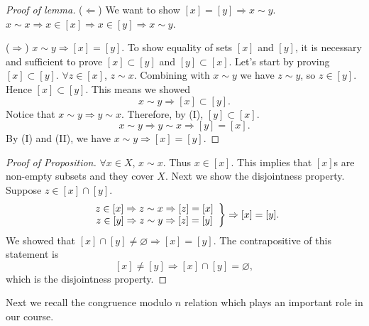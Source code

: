 \begin{proof}[Proof of lemma]
    ($\Leftarrow$) We want to show $[x]=[y]\Rightarrow x\sim y$.
    $x\sim x\Rightarrow x\in[x]\Rightarrow x\in[y]\Rightarrow x\sim y$.

    ($\Rightarrow$) $x\sim y\Rightarrow[x]=[y]$.
    To show equality of sets $[x]$ and $[y]$, it is necessary
    and sufficient to prove $[x]\subset [y]$ and $[y]\subset [x]$.
    Let's start by proving $[x]\subset [y]$.
    $\forall z\in[x]$, $z\sim x$. Combining with $x\sim y$
    we have $z\sim y$, so $z\in[y]$. Hence $[x]\subset [y]$.
    This means we showed
    \begin{equation}
        x\sim y\Rightarrow [x]\subset [y].\tag{I}
    \end{equation}
    Notice that $x\sim y\Rightarrow y\sim x$. Therefore,
    by (I), $[y]\subset [x]$.
    \begin{equation}
        x\sim y\Rightarrow y\sim x\Rightarrow [y]=[x].\tag{II}
    \end{equation}
    By (I) and (II), we have $x\sim y\Rightarrow [x]=[y]$.
\end{proof}


\begin{proof}[Proof of Proposition]
    $\forall x\in X$, $x\sim x$. Thus $x\in[x]$.
    This implies that $[x]$s are non-empty subsets and they cover
    $X$. Next we show the disjointness property.
    Suppose $z\in[x]\cap[y]$.
    \[\left.\begin{array}[]{c}
        z\in[x]\Rightarrow z\sim x\Rightarrow [z]=[x]\\
        z\in[y]\Rightarrow z\sim y\Rightarrow [z]=[y]
    \end{array}\right\}\Rightarrow [x]=[y].\]
    We showed that $[x]\cap[y]\neq\varnothing\Rightarrow [x]=[y]$.
    The contrapositive of this statement is 
    \[[x]\neq [y]\Rightarrow[x]\cap[y]=\varnothing,\]
    which is the disjointness property.
\end{proof}


Next we recall the congruence modulo $n$ relation which 
plays an important role in our course.